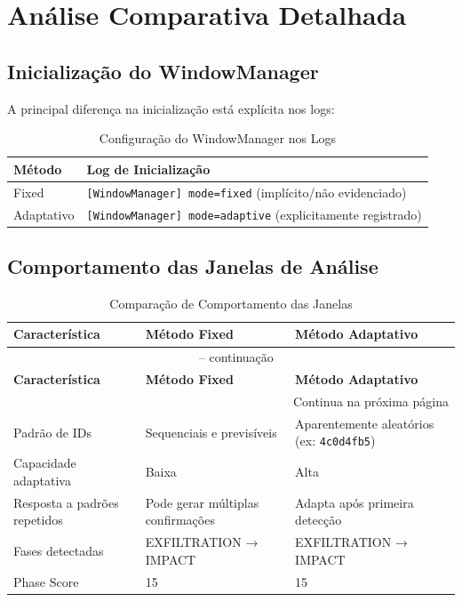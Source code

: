 \documentclass[10pt,a4paper]{article}
\begin{document}
\section{Análise Comparativa Detalhada}

\subsection{Inicialização do WindowManager}

A principal diferença na inicialização está explícita nos logs:

\begin{table}[h]
\centering
\caption{Configuração do WindowManager nos Logs}
\begin{tabular}{@{}p{}p{}@{}}
\toprule
\textbf{Método} & \textbf{Log de Inicialização} \\
\midrule
\cellcolor{azul!10} Fixed & \texttt{[WindowManager] mode=fixed} (implícito/não evidenciado) \\
\cellcolor{verde!10} Adaptativo & \texttt{[WindowManager] mode=adaptive} (explicitamente registrado) \\
\bottomrule
\end{tabular}
\end{table}

\subsection{Comportamento das Janelas de Análise}

\begin{longtable}{@{}p{}p{}p{}@{}}
\caption{Comparação de Comportamento das Janelas}\\
\toprule
\textbf{Característica} & \textbf{Método Fixed} & \textbf{Método Adaptativo} \\
\midrule
\endfirsthead

\multicolumn{3}{c}{{\tablename\ \thetable{} -- continuação}} \\
\toprule
\textbf{Característica} & \textbf{Método Fixed} & \textbf{Método Adaptativo} \\
\midrule
\endhead

\bottomrule
\multicolumn{3}{r}{{Continua na próxima página}} \\
\endfoot

\bottomrule
\endlastfoot

Padrão de IDs & Sequenciais e previsíveis & Aparentemente aleatórios (ex: \texttt{4c0d4fb5}) \\
Capacidade adaptativa & Baixa & Alta \\
Resposta a padrões repetidos & Pode gerar múltiplas confirmações & Adapta após primeira detecção \\
Fases detectadas & EXFILTRATION → IMPACT & EXFILTRATION → IMPACT \\
Phase Score & 15 & 15 \\
\end{longtable}
\end{document}
